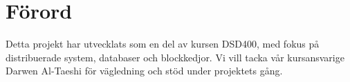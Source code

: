 \thispagestyle{plain}

\section{Förord}
Detta projekt har utvecklats som en del av kursen DSD400, med fokus på distribuerade system, databaser och blockkedjor. Vi vill tacka vår kursansvarige Darwen Al-Taeshi för vägledning och stöd under projektets gång. 